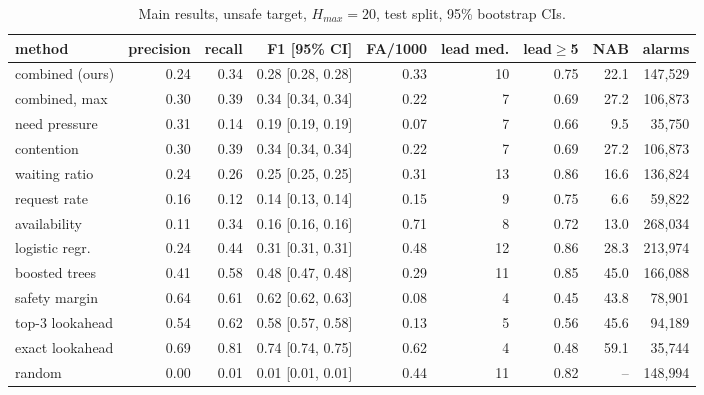\begin{table}[t]
\centering
\footnotesize
\caption{Main results, unsafe target, $H_{max}=20$, test split, 95\% bootstrap CIs.}
\label{tab:main}
\begin{tabular}{lrrrrrrrr}
\toprule
method & precision & recall & F1 [95\% CI] & FA/1000 & lead med. & lead$\geq$5 & NAB & alarms \\
\midrule
combined (ours) & 0.24 & 0.34 & 0.28 [0.28, 0.28] & 0.33 & 10 & 0.75 & 22.1 & 147{,}529 \\
combined, max & 0.30 & 0.39 & 0.34 [0.34, 0.34] & 0.22 & 7 & 0.69 & 27.2 & 106{,}873 \\
need pressure & 0.31 & 0.14 & 0.19 [0.19, 0.19] & 0.07 & 7 & 0.66 & 9.5 & 35{,}750 \\
contention & 0.30 & 0.39 & 0.34 [0.34, 0.34] & 0.22 & 7 & 0.69 & 27.2 & 106{,}873 \\
waiting ratio & 0.24 & 0.26 & 0.25 [0.25, 0.25] & 0.31 & 13 & 0.86 & 16.6 & 136{,}824 \\
request rate & 0.16 & 0.12 & 0.14 [0.13, 0.14] & 0.15 & 9 & 0.75 & 6.6 & 59{,}822 \\
availability & 0.11 & 0.34 & 0.16 [0.16, 0.16] & 0.71 & 8 & 0.72 & 13.0 & 268{,}034 \\
logistic regr. & 0.24 & 0.44 & 0.31 [0.31, 0.31] & 0.48 & 12 & 0.86 & 28.3 & 213{,}974 \\
boosted trees & 0.41 & 0.58 & 0.48 [0.47, 0.48] & 0.29 & 11 & 0.85 & 45.0 & 166{,}088 \\
safety margin & 0.64 & 0.61 & 0.62 [0.62, 0.63] & 0.08 & 4 & 0.45 & 43.8 & 78{,}901 \\
top-3 lookahead & 0.54 & 0.62 & 0.58 [0.57, 0.58] & 0.13 & 5 & 0.56 & 45.6 & 94{,}189 \\
exact lookahead & 0.69 & 0.81 & 0.74 [0.74, 0.75] & 0.62 & 4 & 0.48 & 59.1 & 35{,}744 \\
random & 0.00 & 0.01 & 0.01 [0.01, 0.01] & 0.44 & 11 & 0.82 & -- & 148{,}994 \\
\bottomrule
\end{tabular}
\end{table}
